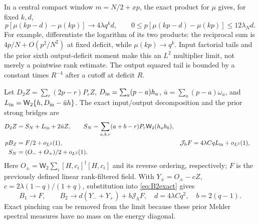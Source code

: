 \documentclass[11pt,a4paper]{article}
\newcommand{\Jh}{\mathcal J_h}
\newcommand{\W}{\mathsf W}
\begin{document}
In a central compact window $m=N/2+xp$, the exact product for
$\mu$ gives, for fixed $k,d$,
\begin{equation}
 p[\mu(kp-d)-\mu(kp)]\to4\lambda q^kd,\qquad
 0\le p[\mu(kp-d)-\mu(kp)]\le12\lambda_Nd.
 \label{eq:slope}
\end{equation}
For example, differentiate the logarithm of its two products:
the reciprocal sum is $4p/N+O(p^2/N^2)$ at fixed deficit,
while $\mu(kp)\to q^k$. Input factorial tails and the prior
sixth output-deficit moment \cite{Central,Raw} make this an
$L^2$ multiplier limit, not merely a pointwise rank estimate.
The output squared tail is bounded by a constant times $R^{-4}$
after a cutoff at deficit $R$.

Let $D_2Z=\sum_r(2p-r)P_rZ$, $D_{\rm in}=\sum_a(p-a)h_a$,
$\bar u=\sum_a(p-a)\omega_a$, and
$L_{\rm in}=\W_2\{h,D_{\rm in}-\bar u h\}$.
The exact input/output decomposition and the prior strong bridges are
\begin{align}
 D_2Z&=S_N+L_{\rm in}+2\bar uZ,\qquad
 S_N=\sum_{a,b,r}(a+b-r)P_r\W_2(h_ah_b),\\
 pB_Z&=F/2+o_{L^2}(1),&
 \Jh F&=4\lambda CqL_{\rm in}+o_{L^2}(1),\\
 S_N&=(O_-+O_+)/2+o_{L^2}(1).
\end{align}
Here $O_\pm=\W_2\sum_i[H,c_i]^\dagger[H,c_i]$ and its reverse
ordering, respectively; $F$ is the previously defined linear
rank-filtered field. With $Y_\pm=O_\pm-cZ$,
$c=2\lambda(1-q)/(1+q)$, substitution into \eqref{eq:B2exact} gives
\begin{equation}
 \boxed{\quad B_1\to F,\qquad
 B_2\to d(Y_-+Y_+)+b\Jh F,
 \quad d=4\lambda Cq^2,\quad b=2(q-1).\quad}
 \label{eq:Blimit}
\end{equation}
Exact pinching can be removed from the limit because these prior
Mehler spectral measures have no mass on the energy diagonal.

\newpage
\end{document}
